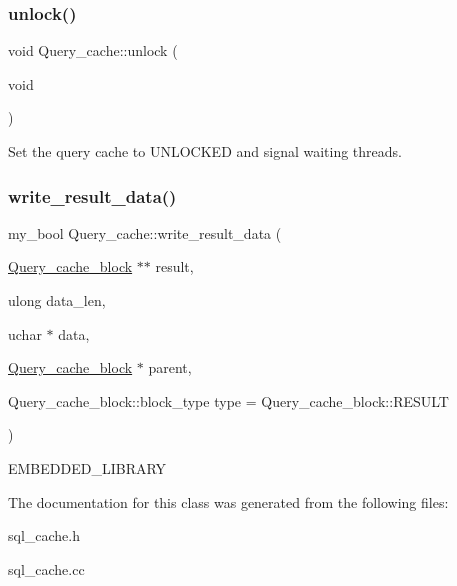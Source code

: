 \subsubsection{\texorpdfstring{unlock()}{unlock()}}
{\footnotesize\ttfamily void Query\+\_\+cache\+::unlock (\begin{DoxyParamCaption}\item[{void}]{ }\end{DoxyParamCaption})}

Set the query cache to U\+N\+L\+O\+C\+K\+ED and signal waiting threads. \mbox{\label{classQuery__cache_a8c24cf21dfd267d54185e10696edc7b0}} 
\subsubsection{\texorpdfstring{write\+\_\+result\+\_\+data()}{write\_result\_data()}}
{\footnotesize\ttfamily my\+\_\+bool Query\+\_\+cache\+::write\+\_\+result\+\_\+data (\begin{DoxyParamCaption}\item[{\mbox{\hyperlink{structQuery__cache__block}{Query\+\_\+cache\+\_\+block}} $\ast$$\ast$}]{result,  }\item[{ulong}]{data\+\_\+len,  }\item[{uchar $\ast$}]{data,  }\item[{\mbox{\hyperlink{structQuery__cache__block}{Query\+\_\+cache\+\_\+block}} $\ast$}]{parent,  }\item[{Query\+\_\+cache\+\_\+block\+::block\+\_\+type}]{type = {\ttfamily Query\+\_\+cache\+\_\+block\+:\+:RESULT} }\end{DoxyParamCaption})\hspace{0.3cm}{\ttfamily [protected]}}

E\+M\+B\+E\+D\+D\+E\+D\+\_\+\+L\+I\+B\+R\+A\+RY 

The documentation for this class was generated from the following files\+:\begin{DoxyCompactItemize}
\item 
sql\+\_\+cache.\+h\item 
sql\+\_\+cache.\+cc\end{DoxyCompactItemize}
